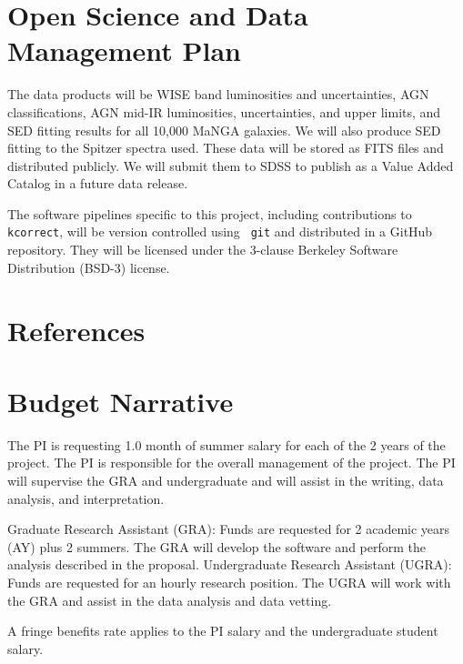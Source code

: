 \documentclass[12pt, preprint]{hacked-aastex}
\begin{document}
\section{Open Science and Data Management Plan\label{sec:data}}
\vspace{-6pt}

The data products will be WISE band luminosities and uncertainties,
AGN classifications, AGN mid-IR luminosities, uncertainties, and upper
limits, and SED fitting results for all 10,000 MaNGA galaxies.  We
will also produce SED fitting to the Spitzer spectra used. These data
will be stored as FITS files and distributed publicly.  We will submit
them to SDSS to publish as a Value Added Catalog in a future data
release.

The software pipelines specific to this project, including
contributions to {\tt kcorrect}, will be version controlled using {\tt
  git} and distributed in a GitHub repository. They will be licensed
under the 3-clause Berkeley Software Distribution (BSD-3) license.

\clearpage
\section{References}\label{sec:refs}

\printbibliography[title=~]

\clearpage
\section{Budget Narrative}\label{sec:budget}

 The PI is requesting 1.0 month of
summer salary for each of the 2 years of the project.  The PI is
responsible for the overall management of the project. The PI will
supervise the GRA and undergraduate and will assist in the writing,
data analysis, and interpretation.

 Graduate Research Assistant (GRA):
Funds are requested for 2 academic years (AY) plus 2 summers. The GRA
will develop the software and perform the analysis described in the
proposal. Undergraduate Research Assistant (UGRA): Funds are requested
for an hourly research position. The UGRA will work with the GRA and
assist in the data analysis and data vetting.

 A fringe benefits rate 
applies to the PI salary and the undergraduate student salary. %
\end{document}
